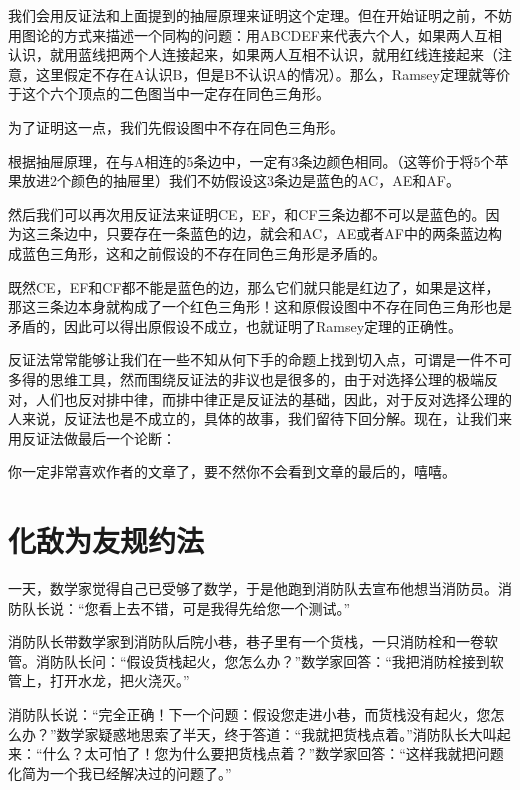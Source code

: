 \documentclass[export, 12pt, letterpaper]{ctexrep}
\newenvironment{shadedquotation}
 {\begin{shaded*}
  \quoting[leftmargin=5pt, rightmargin=5pt, vskip=0pt]
 }
 {\endquoting
 \end{shaded*}
}
\begin{document}
我们会用反证法和上面提到的抽屉原理来证明这个定理。但在开始证明之前，不妨用图论的方式来描述一个同构的问题：用ABCDEF来代表六个人，如果两人互相认识，就用蓝线把两个人连接起来，如果两人互相不认识，就用红线连接起来（注意，这里假定不存在A认识B，但是B不认识A的情况）。那么，Ramsey定理就等价于这个六个顶点的二色图当中一定存在同色三角形。

\begin{center}

\end{center}

为了证明这一点，我们先假设图中不存在同色三角形。

根据抽屉原理，在与A相连的5条边中，一定有3条边颜色相同。（这等价于将5个苹果放进2个颜色的抽屉里）我们不妨假设这3条边是蓝色的AC，AE和AF。

\begin{center}

\end{center}


然后我们可以再次用反证法来证明CE，EF，和CF三条边都不可以是蓝色的。因为这三条边中，只要存在一条蓝色的边，就会和AC，AE或者AF中的两条蓝边构成蓝色三角形，这和之前假设的不存在同色三角形是矛盾的。

既然CE，EF和CF都不能是蓝色的边，那么它们就只能是红边了，如果是这样，那这三条边本身就构成了一个红色三角形！这和原假设图中不存在同色三角形也是矛盾的，因此可以得出原假设不成立，也就证明了Ramsey定理的正确性。

\begin{center}

\end{center}

反证法常常能够让我们在一些不知从何下手的命题上找到切入点，可谓是一件不可多得的思维工具，然而围绕反证法的非议也是很多的，由于对选择公理的极端反对，人们也反对排中律，而排中律正是反证法的基础，因此，对于反对选择公理的人来说，反证法也是不成立的，具体的故事，我们留待下回分解。现在，让我们来用反证法做最后一个论断：

\begin{shadedquotation}
\noindent
你一定非常喜欢作者的文章了，要不然你不会看到文章的最后的，嘻嘻。
\end{shadedquotation}



\section{化敌为友规约法}
\begin{shadedquotation}
\noindent
一天，数学家觉得自己已受够了数学，于是他跑到消防队去宣布他想当消防员。消防队长说：“您看上去不错，可是我得先给您一个测试。”
\noindent

\noindent
消防队长带数学家到消防队后院小巷，巷子里有一个货栈，一只消防栓和一卷软管。消防队长问：“假设货栈起火，您怎么办？”数学家回答：“我把消防栓接到软管上，打开水龙，把火浇灭。”
\noindent

\noindent
消防队长说：“完全正确！下一个问题：假设您走进小巷，而货栈没有起火，您怎么办？”数学家疑惑地思索了半天，终于答道：“我就把货栈点着。”消防队长大叫起来：“什么？太可怕了！您为什么要把货栈点着？”数学家回答：“这样我就把问题化简为一个我已经解决过的问题了。”
\end{shadedquotation}
\end{document}
